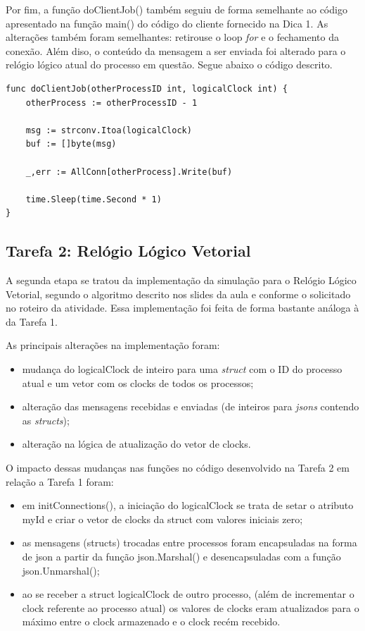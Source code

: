 \documentclass[conference]{IEEEtran}
\begin{document}
	Por fim, a função doClientJob() também seguiu de forma semelhante ao código apresentado na função main() do código do cliente fornecido na Dica 1. As alterações também foram semelhantes: retirouse o loop \textit{for} e o fechamento da conexão. Além diso, o conteúdo da mensagem a ser enviada foi alterado para o relógio lógico atual do processo em questão. Segue abaixo o código descrito.

\begin{lstlisting}
func doClientJob(otherProcessID int, logicalClock int) {
	otherProcess := otherProcessID - 1

	msg := strconv.Itoa(logicalClock)
	buf := []byte(msg)

	_,err := AllConn[otherProcess].Write(buf)

	time.Sleep(time.Second * 1)
}
\end{lstlisting}

	\subsection{Tarefa 2: Relógio Lógico Vetorial}

	A segunda etapa se tratou da implementação da simulação para o Relógio Lógico Vetorial, segundo o algoritmo descrito nos slides da aula e conforme o solicitado no roteiro da atividade. Essa implementação foi feita de forma bastante análoga à da Tarefa 1.
	
	As principais alterações na implementação foram:
\begin{itemize}
\item mudança do logicalClock de inteiro para uma \textit{struct} com o ID do processo atual e um vetor com os clocks de todos os processos;
\item alteração das mensagens recebidas e enviadas (de inteiros para \textit{jsons} contendo as \textit{structs});
\item alteração na lógica de atualização do vetor de clocks.
\end{itemize}

	O impacto dessas mudanças nas funções no código desenvolvido na Tarefa 2 em relação a Tarefa 1 foram:
	
\begin{itemize}
\item em initConnections(), a iniciação do logicalClock se trata de setar o atributo myId e criar o vetor de clocks da struct com valores iniciais zero;
\item as mensagens (structs) trocadas entre processos foram encapsuladas na forma de json a partir da função json.Marshal() e desencapsuladas com a função json.Unmarshal();
\item ao se receber a struct logicalClock de outro processo, (além de incrementar o clock referente ao processo atual) os valores de clocks eram atualizados para o máximo entre o clock armazenado e o clock recém recebido.
\end{itemize}
\end{document}
